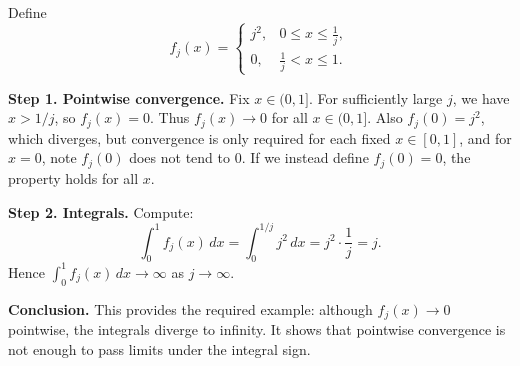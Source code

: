 \begin{solution}
Define
	\[
	f_j(x) =
	\begin{cases}
		j^2, & 0 \leq x \leq \tfrac{1}{j}, \\
		0,   & \tfrac{1}{j} < x \leq 1.
	\end{cases}
	\]

	\textbf{Step 1. Pointwise convergence.}
	Fix $x\in(0,1]$. For sufficiently large $j$, we have $x > 1/j$, so $f_j(x)=0$.
	Thus $f_j(x)\to 0$ for all $x\in(0,1]$.
	Also $f_j(0)=j^2$, which diverges, but convergence is only required for each fixed $x\in[0,1]$, and for $x=0$, note $f_j(0)$ does not tend to $0$.
	If we instead define $f_j(0)=0$, the property holds for all $x$.

	\textbf{Step 2. Integrals.}
	Compute:
	\[
	\int_0^1 f_j(x)\,dx = \int_0^{1/j} j^2\,dx = j^2\cdot \frac{1}{j} = j.
	\]
	Hence $\int_0^1 f_j(x)\,dx \to \infty$ as $j\to\infty$.

	\textbf{Conclusion.}
	This provides the required example: although $f_j(x)\to 0$ pointwise, the integrals diverge to infinity. It shows that pointwise convergence is not enough to pass limits under the integral sign.
\end{solution}

